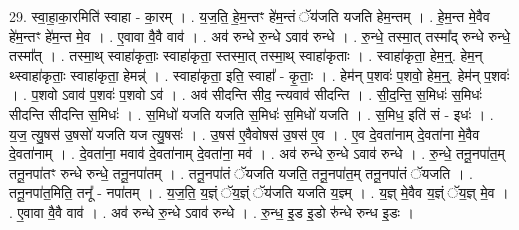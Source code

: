 \documentclass[17pt]{extarticle}
\begin{document}
29. स्वा॒हा॒का॒रमिति॑ स्वाहा - का॒रम् । . य॒ज॒ति॒ हे॒म॒न्तꣳ हे॑म॒न्तं ॅय॑जति यजति हेम॒न्तम् । . हे॒म॒न्त मे॒वैव हे॑म॒न्तꣳ हे॑म॒न्त मे॒व । . ए॒वावा वै॒वै वाव॑ । . अव॑ रुन्धे रु॒न्धे ऽवाव॑ रुन्धे । . रु॒न्धे॒ तस्मा॒त् तस्मा᳚द् रुन्धे रुन्धे॒ तस्मा᳚त् । . तस्मा॒थ् स्वाहा॑कृताः॒ स्वाहा॑कृता॒ स्तस्मा॒त् तस्मा॒थ् स्वाहा॑कृताः । . स्वाहा॑कृता॒ हेम॒न्॒. हेम॒न् थ्स्वाहा॑कृताः॒ स्वाहा॑कृता॒ हेमन्न्॑ । . स्वाहा॑कृता॒ इति॒ स्वाहा᳚ - कृ॒ताः॒ । . हेम॑न् प॒शवः॑ प॒शवो॒ हेम॒न्॒. हेम॑न् प॒शवः॑ । . प॒शवो ऽवाव॑ प॒शवः॑ प॒शवो ऽव॑ । . अव॑ सीदन्ति सीद॒ न्त्यवाव॑ सीदन्ति । . सी॒द॒न्ति॒ स॒मिधः॑ स॒मिधः॑ सीदन्ति सीदन्ति स॒मिधः॑ । . स॒मिधो॑ यजति यजति स॒मिधः॑ स॒मिधो॑ यजति । . स॒मिध॒ इति॑ सं - इधः॑ । . य॒ज॒ त्यु॒षस॑ उ॒षसो॑ यजति यज त्यु॒षसः॑ । . उ॒षस॑ ए॒वैवोषस॑ उ॒षस॑ ए॒व । . ए॒व दे॒वता॑नाम् दे॒वता॑ना मे॒वैव दे॒वता॑नाम् । . दे॒वता॑ना॒ मवाव॑ दे॒वता॑नाम् दे॒वता॑ना॒ मव॑ । . अव॑ रुन्धे रु॒न्धे ऽवाव॑ रुन्धे । . रु॒न्धे॒ तनू॒नपा॑त॒म् तनू॒नपा॑तꣳ रुन्धे रुन्धे॒ तनू॒नपा॑तम् । . तनू॒नपा॑तं ॅयजति यजति॒ तनू॒नपा॑त॒म् तनू॒नपा॑तं ॅयजति । . तनू॒नपा॑त॒मिति॒ तनू᳚ - नपा॑तम् । . य॒ज॒ति॒ य॒ज्ञ्ं ॅय॒ज्ञ्ं ॅय॑जति यजति य॒ज्ञ्म् । . य॒ज्ञ् मे॒वैव य॒ज्ञ्ं ॅय॒ज्ञ् मे॒व । . ए॒वावा वै॒वै वाव॑ । . अव॑ रुन्धे रु॒न्धे ऽवाव॑ रुन्धे । . रु॒न्ध॒ इ॒ड इ॒डो रु॑न्धे रुन्ध इ॒डः । \newline
\end{document}
